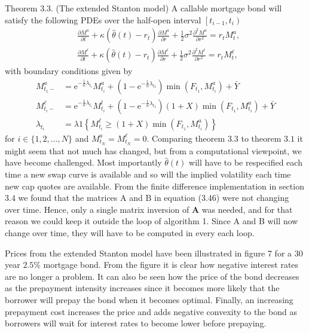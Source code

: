 \documentclass[12pt,twoside]{reedthesis}
\begin{document}
Theorem 3.3. (The extended Stanton model) A callable mortgage bond will satisfy the following PDEs over the half-open interval \(\left[t_{i-1}, t_{i}\right)\)
\[
\begin{aligned}
&\frac{\partial M^{a}}{\partial t}+\kappa\left(\hat{\theta}(t)-r_{t}\right) \frac{\partial M^{a}}{\partial r}+\frac{1}{2} \sigma^{2} \frac{\partial^{2} M^{a}}{\partial r^{2}}=r_{t} M_{t}^{a}, \\
&\frac{\partial M^{\ell}}{\partial t}+\kappa\left(\hat{\theta}(t)-r_{t}\right) \frac{\partial M^{\ell}}{\partial r}+\frac{1}{2} \sigma^{2} \frac{\partial^{2} M^{\ell}}{\partial r^{2}}=r_{t} M_{t}^{\ell},
\end{aligned}
\]
with boundary conditions given by
\[
\begin{aligned}
M_{t_{1}-}^{a} &=\mathrm{e}^{-\frac{1}{n} \lambda_{t_{i}}} M_{t_{i}}^{a}+\left(1-\mathrm{e}^{-\frac{1}{n} \lambda_{t_{2}}}\right) \min \left(F_{t_{1}}, M_{t_{i}}^{a}\right)+\bar{Y} \\
M_{t_{i}-}^{\ell} &=\mathrm{e}^{-\frac{1}{n} \lambda_{t_{i}}} M_{t_{i}}^{l}+\left(1-\mathrm{e}^{-\frac{1}{n} \lambda_{t_{4}}}\right)(1+X) \min \left(F_{t_{1}}, M_{t_{i}}^{a}\right)+\bar{Y} \\
\lambda_{t_{i}} &=\lambda 1\left\{M_{t_{i}}^{\ell} \geq(1+X) \min \left(F_{t_{1}}, M_{t_{i}}^{a}\right)\right\}
\end{aligned}
\]
for \(i \in\{1,2, \ldots, N\}\) and \(M_{t_{N}}^{a}=M_{t_{N}}^{\ell}=0\).
Comparing theorem \(3.3\) to theorem \(3.1\) it might seem that not much has changed, but from a computational viewpoint, we have become challenged. Most importantly \(\hat{\theta}(t)\) will have to be respecified each time a new swap curve is available and so will the implied volatility each time new cap quotes are available. From the finite difference implementation in section \(3.4\) we found that the matrices \(\mathrm{A}\) and \(\mathrm{B}\) in equation (3.46) were not changing over time. Hence, only a single matrix inversion of \(\mathbf{A}\) was needed, and for that reason we could keep it outside the loop of algorithm 1. Since A and B will now change over time, they will have to be computed in every each loop.

Prices from the extended Stanton model have been illustrated in figure 7 for a 30 year \(2.5 \%\) mortgage bond. From the figure it is clear how negative interest rates are no longer a problem. It can also be seen how the price of the bond decreases as the prepayment intensity increases since it becomes more likely that the borrower will prepay the bond when it becomes optimal. Finally, an increasing prepayment cost increases the price and adds negative convexity to the bond as borrowers will wait for interest rates to become lower before prepaying.
\end{document}
